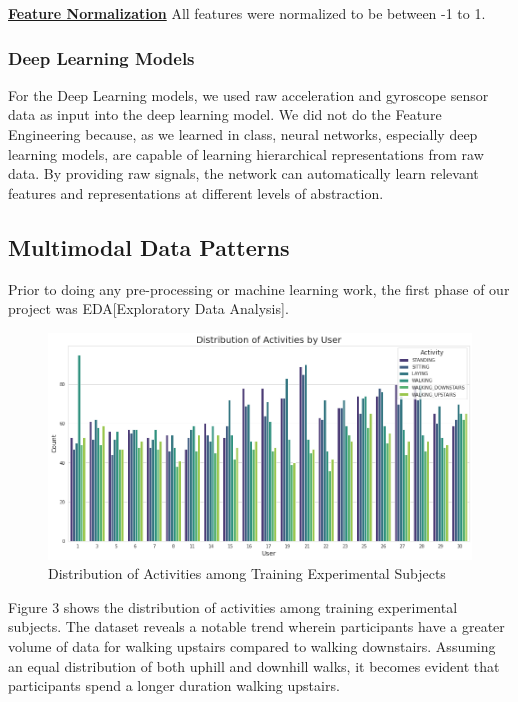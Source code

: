 \documentclass[conference]{IEEEtran}
\begin{document}
\textbf{\underline{Feature Normalization}} \newline 
All features were normalized to be between -1 to 1. \newline 

\subsubsection{Deep Learning Models}
For the Deep Learning models, we used raw acceleration and gyroscope sensor data as input into the deep learning model. We did not do the Feature Engineering because, as we learned in class, neural networks, especially deep learning models, are capable of learning hierarchical representations from raw data. By providing raw signals, the network can automatically learn relevant features and representations at different levels of abstraction.

\subsection{Multimodal Data Patterns}
Prior to doing any pre-processing or machine learning work, the first phase of our project was EDA[Exploratory Data Analysis]. 

\begin{figure}[h!]
	\includegraphics[width= 1.0 \linewidth]{activity_distribution.png}
	\centering
	\caption{Distribution of Activities among Training Experimental Subjects}
	\label{activity_distribution.png}
\end{figure}

Figure 3 shows the distribution of activities among training experimental subjects. The dataset reveals a notable trend wherein participants have a greater volume of data for walking upstairs compared to walking downstairs. Assuming an equal distribution of both uphill and downhill walks, it becomes evident that participants spend a longer duration walking upstairs. \newline 
\end{document}
